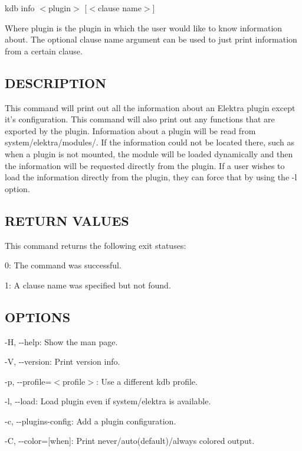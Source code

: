 {\ttfamily kdb info $<$plugin$>$ \mbox{[}$<$clause name$>$\mbox{]}}

Where {\ttfamily plugin} is the plugin in which the user would like to know information about. The optional {\ttfamily clause name} argument can be used to just print information from a certain clause.

\subsection*{D\+E\+S\+C\+R\+I\+P\+T\+I\+O\+N}

This command will print out all the information about an Elektra plugin except it's configuration. This command will also print out any functions that are exported by the plugin. Information about a plugin will be read from {\ttfamily system/elektra/modules/}. If the information could not be located there, such as when a plugin is not mounted, the module will be loaded dynamically and then the information will be requested directly from the plugin. If a user wishes to load the information directly from the plugin, they can force that by using the {\ttfamily -\/l} option.

\subsection*{R\+E\+T\+U\+R\+N V\+A\+L\+U\+E\+S}

This command returns the following exit statuses\+:


\begin{DoxyItemize}
\item 0\+: The command was successful.
\item 1\+: A {\ttfamily clause name} was specified but not found.
\end{DoxyItemize}

\subsection*{O\+P\+T\+I\+O\+N\+S}


\begin{DoxyItemize}
\item {\ttfamily -\/\+H}, {\ttfamily -\/-\/help}\+: Show the man page.
\item {\ttfamily -\/\+V}, {\ttfamily -\/-\/version}\+: Print version info.
\item {\ttfamily -\/p}, {\ttfamily -\/-\/profile}=$<$profile$>$\+: Use a different kdb profile.
\item {\ttfamily -\/l}, {\ttfamily -\/-\/load}\+: Load plugin even if system/elektra is available.
\item {\ttfamily -\/c}, {\ttfamily -\/-\/plugins-\/config}\+: Add a plugin configuration.
\item {\ttfamily -\/\+C}, {\ttfamily -\/-\/color}=\mbox{[}when\mbox{]}\+: Print never/auto(default)/always colored output.
\end{DoxyItemize}

